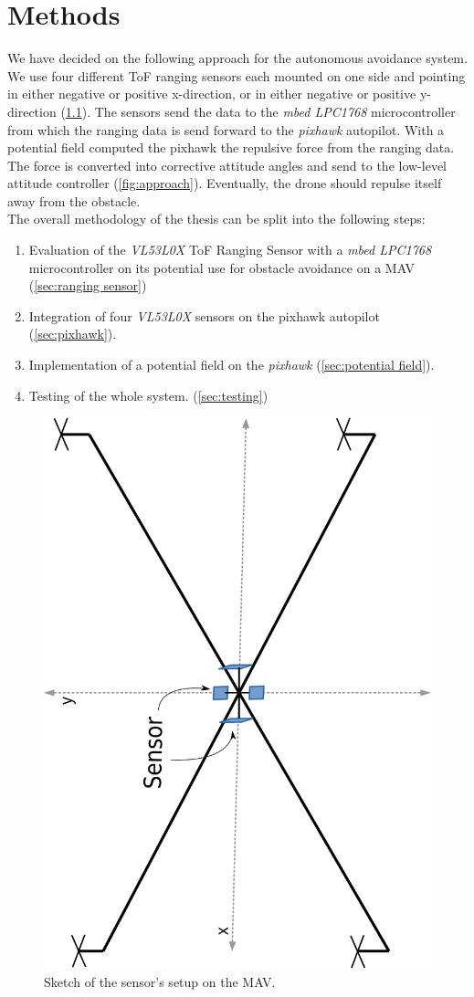 \chapter{Methods}
\label{ch:methods}
We have decided on the following approach for the autonomous avoidance system. We use four different ToF ranging sensors each mounted on one side and pointing in either negative or positive x-direction, or in either negative or positive y-direction (\cref{fig:sketch}). The sensors send the data to the \textit{mbed LPC1768} microcontroller from which the ranging data is send forward to the \textit{pixhawk} autopilot. With a  potential field computed the pixhawk the repulsive force from the ranging data. The force is converted into corrective attitude angles and send to the low-level attitude controller (\cref{fig:approach}). Eventually, the drone should repulse itself away from the obstacle.\\

The overall methodology of the thesis can be split into the following steps:
\begin{enumerate}
	\item Evaluation of the \textit{VL53L0X} ToF Ranging Sensor with a \textit{mbed LPC1768} microcontroller on its potential use for obstacle avoidance on a MAV (\cref{sec:ranging sensor})
	\item Integration of four \textit{VL53L0X} sensors on the pixhawk autopilot (\cref{sec:pixhawk}).
	\item Implementation of a potential field on the \textit{pixhawk} (\cref{sec:potential field}).
	\item Testing of the whole system.  (\cref{sec:testing})
\end{enumerate}

\begin{figure}
	\centering
	\includegraphics[width=0.4\linewidth, angle = 270]{pictures/mav_sketch.pdf}
	\caption{Sketch of the sensor's setup on the MAV.}
	\label{fig:sketch}
\end{figure}

